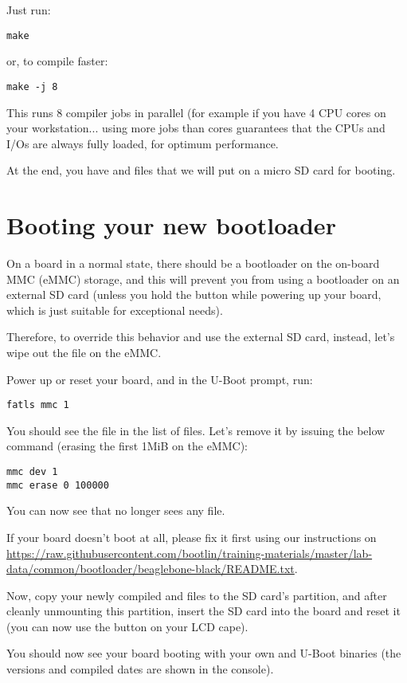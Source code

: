 Just run:
\begin{verbatim}
make
\end{verbatim}

or, to compile faster:

\begin{verbatim}
make -j 8
\end{verbatim}

This runs 8 compiler jobs in parallel (for example if you have 4 CPU
cores on your workstation... using more jobs than cores guarantees that
the CPUs and I/Os are always fully loaded, for optimum performance.

At the end, you have  and  files that we will
put on a micro SD card for booting.



\section{Booting your new bootloader}

On a board in a normal state, there should be a bootloader on the on-board MMC
(eMMC) storage, and this will prevent you from using a bootloader on an
external SD card (unless you hold the  button while powering
up your board, which is just suitable for exceptional needs).

Therefore, to override this behavior and use the external SD card,
instead, let's wipe out the  file on the eMMC.

Power up or reset your board, and in the U-Boot prompt, run:

\begin{verbatim}
fatls mmc 1
\end{verbatim}

You should see the  file in the list of files. Let's remove it
by issuing the below command (erasing the first 1MiB on the eMMC):

\begin{verbatim}
mmc dev 1
mmc erase 0 100000
\end{verbatim}

You can now see that  no longer sees any file.

If your board doesn't boot at all, please fix it first using our instructions
on
\url{https://raw.githubusercontent.com/bootlin/training-materials/master/lab-data/common/bootloader/beaglebone-black/README.txt}.

Now, copy your newly compiled  and  files to
the SD card's  partition, and after cleanly unmounting this
partition, insert the SD card into the board and reset it (you can now
use the  button on your LCD cape).

You should now see your board booting with your own  and U-Boot
binaries (the versions and compiled dates are shown in the console).
